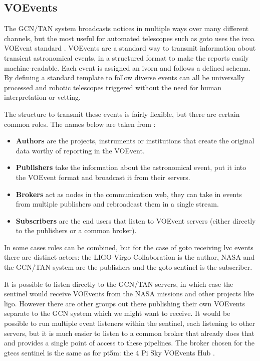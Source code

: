 \begin{colsection}

\newpage
\subsection{VOEvents}
\label{sec:voevents}
\begin{colsection}

The GCN/TAN system broadcasts notices in multiple ways over many different channels, but the most useful for automated telescopes such as \gls{goto} uses the \gls{ivoa} VOEvent standard \citep{voevent}. VOEvents are a standard way to transmit information about transient astronomical events, in a structured format to make the reports easily machine-readable. Each event is assigned an \gls{ivorn} and follows a defined schema. By defining a standard template to follow diverse events can all be universally processed and robotic telescopes triggered without the need for human interpretation or vetting.

The structure to transmit these events is fairly flexible, but there are certain common roles. The names below are taken from \citet{voevent}:

\begin{itemize}
    \item \textbf{Authors} are the projects, instruments or institutions that create the original data worthy of reporting in the VOEvent.
    \item \textbf{Publishers} take the information about the astronomical event, put it into the VOEvent format and broadcast it from their servers.
    \item \textbf{Brokers} act as nodes in the communication web, they can take in events from multiple publishers and rebroadcast them in a single stream.
    \item \textbf{Subscribers} are the end users that listen to VOEvent servers (either directly to the publishers or a common broker).
\end{itemize}

In some cases roles can be combined, but for the case of \gls{goto} receiving \gls{lvc} events there are distinct actors: the LIGO-Virgo Collaboration is the author, NASA and the GCN/TAN system are the publishers and the \gls{goto} sentinel is the subscriber.

It is possible to listen directly to the GCN/TAN servers, in which case the sentinel would receive VOEvents from the NASA missions and other projects like \gls{ligo}. However there are other groups out there publishing their own VOEvents separate to the GCN system which we might want to receive. It would be possible to run multiple event listeners within the sentinel, each listening to other servers, but it is much easier to listen to a common broker that already does that and provides a single point of access to these pipelines. The broker chosen for the \gls{gtecs} sentinel is the same as for pt5m: the 4 Pi Sky VOEvents Hub \citep{4pisky}.


\end{colsection}
\end{colsection}
